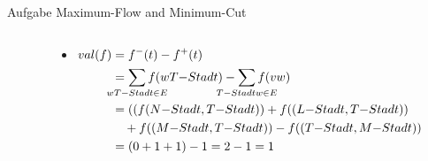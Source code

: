 \begin{frame}[allowframebreaks]{Aufgabe \thesection}{Maximum-Flow and Minimum-Cut}
\begin{requirementsnoinc}
\begin{columns}
\begin{column}{0.5\textwidth}
{\begin{minipage}[t]{8cm}
\begin{itemize}
            \end{itemize}
          \end{minipage}
        }
      \end{column}
    \end{columns}
  \end{requirementsnoinc}
  \framebreak
  \begin{solution}
    \begin{columns}
      \begin{column}{0.4\textwidth}
      \end{column}
      \begin{column}{0.6\textwidth}
        \begin{itemize}
          \tiny
          \item $\begin{aligned}[t]\displaystyle val(f) &= f^-(t) - f^+(t)\\
            &= \sum_{\mathclap{\substack{w T-Stadt\in E}}} f(w T{-}Stadt) - \sum_{\mathclap{\substack{T{-}Stadt w\in E}}} f(vw)\\
            &= ((f(N{-}Stadt, T{-}Stadt)) + f((L{-}Stadt, T{-}Stadt)) \\
            &\quad + f((M{-}Stadt, T{-}Stadt)) - f((T{-}Stadt, M{-}Stadt))\\
            &= (0 + 1 + 1 ) - 1 = 2 - 1 = 1\\
          \end{aligned}$
        \end{itemize}
      \end{column}
    \end{columns}
  \end{solution}
  \begin{solution}
    \begin{columns}
      \begin{column}{0.5\textwidth}
      \end{column}
      \begin{column}{0.5\textwidth}
        \resizebox{\textwidth}{!}{
          \begin{minipage}[t]{14cm}

\end{minipage}}
\end{column}
\end{columns}
\end{solution}
\end{frame}
